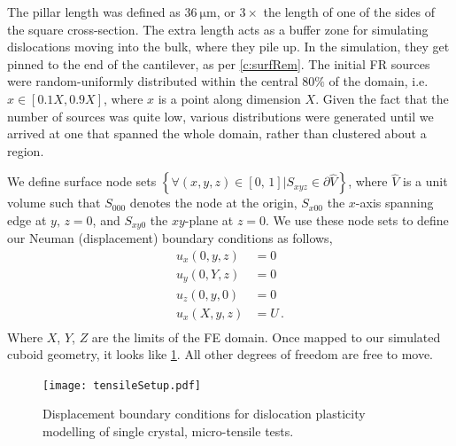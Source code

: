 The pillar length was defined as $\SI{36}{\micro\metre}$, or $3\times$ the length of one of the sides of the square cross-section. The extra length acts as a buffer zone for simulating dislocations moving into the bulk, where they pile up. In the simulation, they get pinned to the end of the cantilever, as per \cref{c:surfRem}. The initial FR sources were random-uniformly distributed within the central $80\%$ of the domain, i.e. $x \in [0.1X, 0.9X]$, where $x$ is a point along dimension $X$. Given the fact that the number of sources was quite low, various distributions were generated until we arrived at one that spanned the whole domain, rather than clustered about a region.

We define surface node sets $\left\{\forall (x, y, z) \in [0,\, 1] \vert S_{xyz} \in \partial \hat{V}\right\}$, where $\hat{V}$ is a unit volume such that $S_{000}$ denotes the node at the origin, $S_{x00}$ the $x$-axis spanning edge at $y,\, z=0$, and $S_{xy0}$ the $xy$-plane at $z=0$. We use these node sets to define our Neuman (displacement) boundary conditions as follows,
\begin{subequations}
    \begin{align}
        u_x(0, y, z) & = 0    \\
        u_y(0, Y, z) & = 0    \\
        u_z(0, y, 0) & = 0    \\
        u_x(X, y, z) & = U\,. \\
    \end{align}
\end{subequations}
Where $X$, $Y$, $Z$ are the limits of the FE domain. Once mapped to our simulated cuboid geometry, it looks like \cref{f:tensileSetup}. All other degrees of freedom are free to move.
\begin{figure}
    \centering
    \texttt{[image: tensileSetup.pdf]}
    \caption[Displacement boundary conditions for dislocation plasticity modelling of single crystal, micro-tensile tests.]{Displacement boundary conditions for dislocation plasticity modelling of single crystal, micro-tensile tests.}
    \label{f:tensileSetup}
\end{figure}

